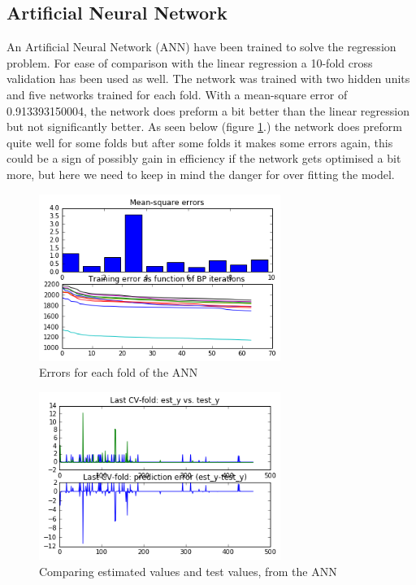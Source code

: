 \subsection{Artificial Neural Network}
An Artificial Neural Network (ANN) have been trained to solve the regression problem. For ease of comparison with the linear regression a 10-fold cross validation has been used as well. The network was trained with two hidden units and five networks trained for each fold. With a mean-square error of 0.913393150004, the network does preform a bit better than the linear regression but not significantly better. As seen below (figure \ref{fig:errors_regression_ANN}.) the network does preform quite well for some folds but after some folds it makes some errors again, this could be a sign of possibly gain in efficiency if the network gets optimised a bit more, but here we need to keep in mind the danger for over fitting the model. 

\vspace{-5pt}
\begin{figure}[!ht]
	\centering
	\includegraphics[width=0.7\textwidth]{Fig/regression_ANN_1.png}
	\vspace{-5pt}
	\caption{Errors for each fold of the ANN}
	\label{fig:errors_regression_ANN}
\end{figure}

\vspace{-5pt}
\begin{figure}[!ht]
	\centering
	\includegraphics[width=0.7\textwidth]{Fig/regression_ANN_2.png}
	\vspace{-5pt}
	\caption{Comparing estimated values and test values, from the ANN}
	\label{fig:estimated_vs_test_values_ANN}
\end{figure}